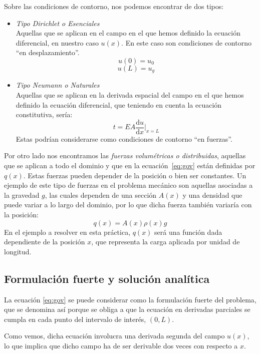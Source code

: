 \documentclass[spanish,a4paper,12pt]{article}
\begin{document}
Sobre las condiciones de contorno, nos podemos encontrar de dos tipos:
\begin{itemize}
\item \textit{Tipo Dirichlet o Esenciales}\\
Aquellas que se aplican en el campo en el que hemos definido la ecuación diferencial, en nuestro caso \(u(x)\). En este caso son condiciones de contorno ``en desplazamiento''.
$$
u(0)=u_0
$$$$
u(L)=u_g
$$
\item \textit{Tipo Neumann o Naturales}\\
Aquellas que se aplican en la derivada espacial del campo en el que hemos definido la ecuación diferencial, que teniendo en cuenta la ecuación constitutiva, sería:
$$
t= EA \frac{\mathrm{d} u}{\mathrm{d} x} \biggr\rvert_{x=L}
$$
Estas podrían considerarse como condiciones de contorno ``en fuerzas''.
\end{itemize}

Por otro lado nos encontramos las \textit{fuerzas volumétricas o distribuidas}, aquellas que se aplican a todo el dominio y que en la ecuación~\eqref{eq:gov} están definidas por $q(x)$. Estas fuerzas pueden depender de la posición o bien ser constantes.
Un ejemplo de este tipo de fuerzas en el problema mecánico son aquellas asociadas a la gravedad $g$, las cuales dependen de una sección $A(x)$ y una densidad que puede variar a lo largo del dominio, por lo que dicha fuerza también variaría con la posición:
\begin{equation*}
q(x) =A(x) \rho(x) g
\end{equation*}
En el ejemplo a resolver en esta práctica, $q(x)$ será una función dada dependiente de la posición $x$, que representa la carga aplicada por unidad de longitud.

\subsection{Formulación fuerte y solución analítica}
\label{sec:analitica}
La ecuación \eqref{eq:gov} se puede considerar como la formulación fuerte del problema, que se denomina así porque se obliga a que la ecuación en derivadas parciales se cumpla en cada punto del intervalo de interés, $(0,L)$. 

Como vemos, dicha ecuación involucra una derivada segunda del campo \(u(x)\), lo que implica que dicho campo ha de ser derivable dos veces con respecto a $x$.\\
\end{document}
